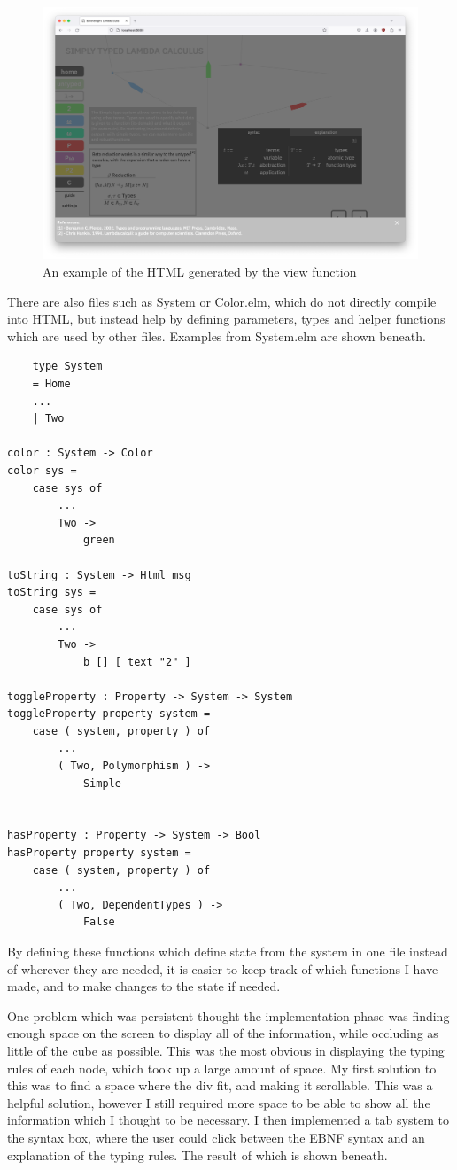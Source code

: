 \documentclass{l4proj}
\begin{document}
\begin{figure}[h!]
    \centering
    \includegraphics[width=0.8\linewidth]{dissertation/images/final_citations.png}
    \caption{An example of the HTML generated by the view function}
    \label{fig:enter-label}
\end{figure}

There are also files such as System or Color.elm, which do not directly compile into HTML, but instead help by defining parameters, types and helper functions which are used by other files.  Examples from System.elm are shown beneath.

\begin{lstlisting}
    type System
    = Home
    ...
    | Two

color : System -> Color
color sys =
    case sys of
        ...
        Two ->
            green

toString : System -> Html msg
toString sys =
    case sys of
        ...
        Two ->
            b [] [ text "2" ]

toggleProperty : Property -> System -> System
toggleProperty property system =
    case ( system, property ) of
        ...
        ( Two, Polymorphism ) ->
            Simple


hasProperty : Property -> System -> Bool
hasProperty property system =
    case ( system, property ) of
        ...
        ( Two, DependentTypes ) ->
            False
\end{lstlisting}

By defining these functions which define state from the system in one file instead of wherever they are needed, it is easier to keep track of which functions I have made, and to make changes to the state if needed.

One problem which was persistent thought the implementation phase was finding enough space on the screen to display all of the information, while occluding as little of the cube as possible.  This was the most obvious in displaying the typing rules of each node, which took up a large amount of space.  My first solution to this was to find a space where the div fit, and making it scrollable.  This was a helpful solution, however I still required more space to be able to show all the information which I thought to be necessary.  I then implemented a tab system to the syntax box, where the user could click between the EBNF syntax and an explanation of the typing rules. The result of which is shown beneath.
\end{document}
